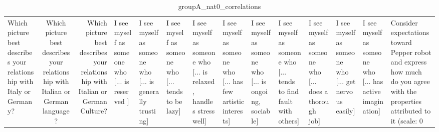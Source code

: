 \begin{table}
\caption{groupA_nat0_correlations}
\label{tab:groupA_nat0_correlations}
\begin{tabular}{lcr}
\toprule
Which picture best describes your relationship with Italy or Germany? & Which picture best describes your relationship with Italian or German language? & Which picture best describes your relationship with Italian or German Culture? & I see myself as someone who  [... is reserved ] & I see myself as someone who  [... is generally trusting] & I see myself as someone who  [... tends to be lazy] & I see myself as someone who  [... is relaxed, handles stress well] & I see myself as someone who  [... has few artistic interests] & I see myself as someone who  [... is ongoing, sociable] & I see myself as someone who  [... tends to find fault with others] & I see myself as someone who  [... does a thorough job] & I see myself as someone who  [... get nervous easily] & I see myself as someone who  [... has active imagination] & Consider expectations toward Pepper robot and express how much do you agree with the properties attributed to it (scale: 0%
\end{tabular}
\end{table}
